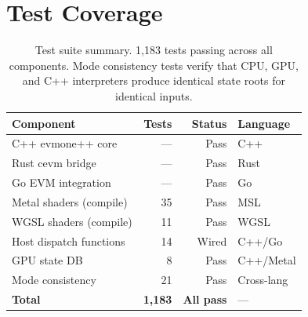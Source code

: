 \section{Test Coverage}


\begin{table}[h]
\centering
\small
\begin{tabular}{lrrl}
\toprule
\textbf{Component} & \textbf{Tests} & \textbf{Status} & \textbf{Language} \\
\midrule
C++ evmone++ core        & ---  & Pass & C++ \\
Rust cevm bridge          & ---  & Pass & Rust \\
Go EVM integration        & ---  & Pass & Go \\
Metal shaders (compile)   & 35   & Pass & MSL \\
WGSL shaders (compile)    & 11   & Pass & WGSL \\
Host dispatch functions    & 14   & Wired & C++/Go \\
GPU state DB              & 8    & Pass & C++/Metal \\
Mode consistency          & 21   & Pass & Cross-lang \\
\midrule
\textbf{Total}            & \textbf{1{,}183} & \textbf{All pass} & --- \\
\bottomrule
\end{tabular}
\caption{Test suite summary. 1{,}183 tests passing across all components.
Mode consistency tests verify that CPU, GPU, and C++ interpreters produce
identical state roots for identical inputs.}
\label{tab:tests}
\end{table}

